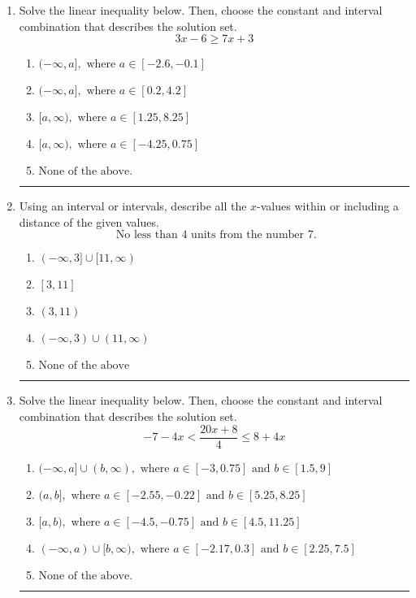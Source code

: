 \documentclass[14pt]{extbook}
\newcommand{\litem}[1]{\item#1\hspace*{-1cm}\rule{\textwidth}{0.4pt}}
\begin{document}
\begin{enumerate}
{\begin{enumerate}[label=\Alph*.]
\end{enumerate} }
\litem{
Solve the linear inequality below. Then, choose the constant and interval combination that describes the solution set.\[ 3x -6 \geq 7x + 3 \]\begin{enumerate}[label=\Alph*.]
\item \( (-\infty, a], \text{ where } a \in [-2.6, -0.1] \)
\item \( (-\infty, a], \text{ where } a \in [0.2, 4.2] \)
\item \( [a, \infty), \text{ where } a \in [1.25, 8.25] \)
\item \( [a, \infty), \text{ where } a \in [-4.25, 0.75] \)
\item \( \text{None of the above}. \)

\end{enumerate} }
\litem{
Using an interval or intervals, describe all the $x$-values within or including a distance of the given values.\[ \text{ No less than } 4 \text{ units from the number } 7. \]\begin{enumerate}[label=\Alph*.]
\item \( (-\infty, 3] \cup [11, \infty) \)
\item \( [3, 11] \)
\item \( (3, 11) \)
\item \( (-\infty, 3) \cup (11, \infty) \)
\item \( \text{None of the above} \)

\end{enumerate} }
\litem{
Solve the linear inequality below. Then, choose the constant and interval combination that describes the solution set.\[ -7 - 4 x < \frac{20 x + 8}{4} \leq 8 + 4 x \]\begin{enumerate}[label=\Alph*.]
\item \( (-\infty, a] \cup (b, \infty), \text{ where } a \in [-3, 0.75] \text{ and } b \in [1.5, 9] \)
\item \( (a, b], \text{ where } a \in [-2.55, -0.22] \text{ and } b \in [5.25, 8.25] \)
\item \( [a, b), \text{ where } a \in [-4.5, -0.75] \text{ and } b \in [4.5, 11.25] \)
\item \( (-\infty, a) \cup [b, \infty), \text{ where } a \in [-2.17, 0.3] \text{ and } b \in [2.25, 7.5] \)
\item \( \text{None of the above.} \)


\end{enumerate}}
\end{enumerate}
\end{document}
